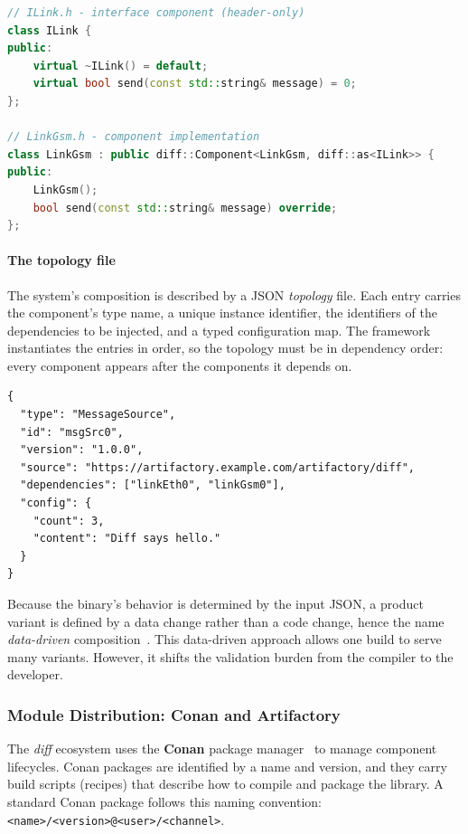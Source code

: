 \begin{lstlisting}[language=C++, caption={A \textit{diff} component that implements the \texttt{ILink} interface.}, label=lst:diff-component, aboveskip=10pt]
// ILink.h - interface component (header-only)
class ILink {
public:
    virtual ~ILink() = default;
    virtual bool send(const std::string& message) = 0;
};

// LinkGsm.h - component implementation
class LinkGsm : public diff::Component<LinkGsm, diff::as<ILink>> {
public:
    LinkGsm();
    bool send(const std::string& message) override;
};
\end{lstlisting}

\paragraph{The topology file}
The system's composition is described by a JSON \textit{topology} file. Each entry carries the component's type name, a unique instance identifier, the identifiers of the dependencies to be injected, and a typed configuration map. The framework instantiates the entries in order, so the topology must be in dependency order: every component appears after the components it depends on.

\begin{lstlisting}[caption={Topology entry consumed by the \textit{diff} loader.}, label=lst:topology-entry, aboveskip=10pt]
{
  "type": "MessageSource",
  "id": "msgSrc0",
  "version": "1.0.0",
  "source": "https://artifactory.example.com/artifactory/diff",
  "dependencies": ["linkEth0", "linkGsm0"],
  "config": {
    "count": 3,
    "content": "Diff says hello."
  }
}
\end{lstlisting}

Because the binary's behavior is determined by the input JSON, a product variant is defined by a data change rather than a code change, hence the name \textit{data-driven} composition~\cite{niespodziany2025}. This data-driven approach allows one build to serve many variants. However, it shifts the validation burden from the compiler to the developer.

\subsubsection{Module Distribution: Conan and Artifactory}
\label{sec:module-distribution}

The \textit{diff} ecosystem uses the \textbf{Conan} package manager~\cite{conan} to manage component lifecycles. Conan packages are identified by a name and version, and they carry build scripts (recipes) that describe how to compile and package the library. A standard Conan package follows this naming convention: \texttt{<name>/<version>@<user>/<channel>}.


